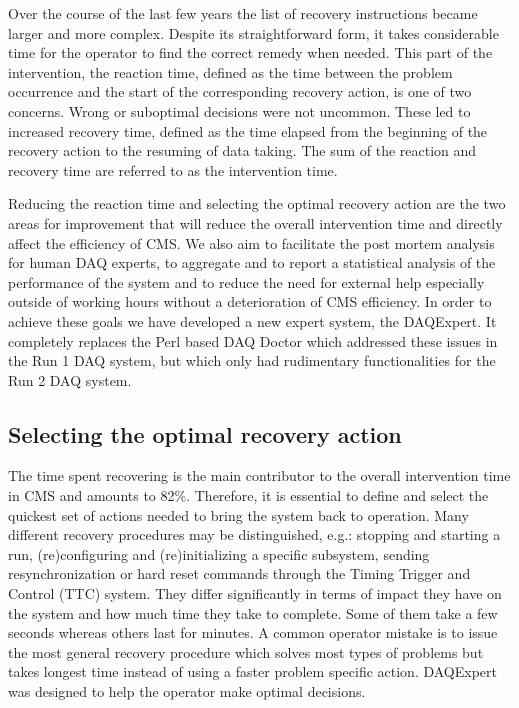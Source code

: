 \documentclass[a4paper]{jpconf}
\begin{document}
Over the course of the last few years the list of recovery instructions became larger and more complex. Despite its straightforward form, it takes considerable time for the operator to find the correct remedy when needed. This part of the intervention, the reaction time, defined as the time between the problem occurrence and the start of the corresponding recovery action, is one of two concerns. Wrong or suboptimal decisions were not uncommon. These led to increased recovery time, defined as the time elapsed from the beginning of the recovery action to the resuming of data taking. The sum of the reaction and recovery time are referred to as the intervention time.

Reducing the reaction time and selecting the optimal recovery action are the two areas for improvement that will reduce the overall intervention time and directly affect the efficiency of CMS. We also aim to facilitate the post mortem analysis for human DAQ experts, to aggregate and to report a statistical analysis of the performance of the system and to reduce the need for external help especially outside of working hours without a deterioration of CMS efficiency. In order to achieve these goals we have developed a new expert system, the DAQExpert. It completely replaces the Perl based DAQ Doctor \cite{daqdoctor} which addressed these issues in the Run 1 DAQ system, but which only had rudimentary functionalities for the Run 2 DAQ system.

\subsection{Selecting the optimal recovery action}
The time spent recovering is the main contributor to the overall intervention time in CMS and amounts to 82\%. Therefore, it is essential to define and select the quickest set of actions needed to bring the system back to operation. Many different recovery procedures may be distinguished, e.g.: stopping and starting a run, (re)configuring and (re)initializing a specific subsystem, sending resynchronization or hard reset commands through the Timing Trigger and Control (TTC) system. They differ significantly in terms of impact they have on the system and how much time they take to complete. Some of them take a few seconds whereas others last for minutes. A common operator mistake is to issue the most general recovery procedure which solves most types of problems but takes longest time instead of using a faster problem specific action. DAQExpert was designed to help the operator make optimal decisions.
\end{document}
